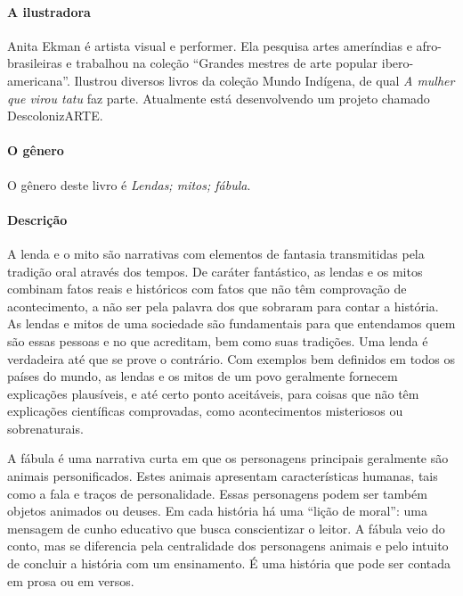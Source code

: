 \documentclass[11pt]{extarticle}
\begin{document}

\paragraph{A ilustradora} Anita Ekman é artista visual e performer. Ela pesquisa artes ameríndias e afro-brasileiras e trabalhou na coleção ``Grandes mestres de arte popular ibero-americana''. Ilustrou diversos livros da coleção Mundo Indígena, de qual \textit{A mulher que virou tatu} faz parte. Atualmente está desenvolvendo um projeto chamado DescolonizARTE.


\paragraph{O gênero} O gênero deste livro é \textit{Lendas; mitos; fábula}. 

\paragraph{Descrição} A lenda e o mito são narrativas com elementos de fantasia transmitidas pela tradição oral através dos tempos. De caráter fantástico, as lendas e os mitos combinam fatos reais e históricos com fatos que não têm comprovação de acontecimento, a não ser pela palavra dos que sobraram para contar a história. As lendas e mitos de uma sociedade são fundamentais para que entendamos quem são essas pessoas e no que acreditam, bem como suas tradições. Uma lenda é verdadeira até que se prove o contrário. Com exemplos bem definidos em todos os países do mundo, as lendas e os mitos de um povo geralmente fornecem explicações plausíveis, e até certo ponto aceitáveis, para coisas que não têm explicações científicas comprovadas, como acontecimentos misteriosos ou sobrenaturais.


A fábula é uma narrativa curta em que os personagens principais geralmente são animais personificados. Estes animais apresentam características humanas, tais como a fala e traços de personalidade. Essas personagens podem ser também objetos animados ou deuses. Em cada história há uma ``lição de moral'': uma mensagem de cunho educativo que busca conscientizar o leitor. A fábula veio do conto, mas se diferencia pela centralidade dos personagens animais e pelo intuito de concluir a história com um ensinamento. É uma história que pode ser contada em prosa ou em versos. 
\end{document}

